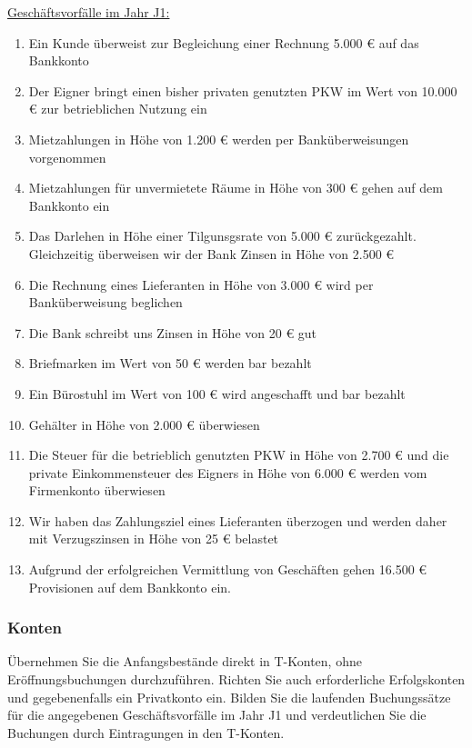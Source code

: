 \documentclass[paper=a4, fontsize=11pt]{scrartcl}
\numberwithin{equation}{section}
\numberwithin{figure}{section}
\numberwithin{table}{section}
\begin{document}
\underline{Geschäftsvorfälle im Jahr J1:} 

\begin{enumerate}
\item Ein Kunde überweist zur Begleichung einer Rechnung 5.000 € auf das Bankkonto
\item Der Eigner bringt einen bisher privaten genutzten PKW im Wert von 10.000 € zur betrieblichen Nutzung ein
\item Mietzahlungen in Höhe von 1.200 € werden per Banküberweisungen vorgenommen
\item Mietzahlungen für unvermietete Räume in Höhe von 300 € gehen auf dem Bankkonto ein
\item Das Darlehen in Höhe einer Tilgunsgsrate von 5.000 € zurückgezahlt. Gleichzeitig überweisen wir der Bank Zinsen in Höhe von 2.500 €
\item Die Rechnung eines Lieferanten in Höhe von 3.000 € wird per Banküberweisung beglichen
\item Die Bank schreibt uns Zinsen in Höhe von 20 € gut
\item Briefmarken im Wert von 50 € werden bar bezahlt
\item Ein Bürostuhl im Wert von 100 € wird angeschafft und bar bezahlt
\item Gehälter in Höhe von 2.000 € überwiesen
\item Die Steuer für die betrieblich genutzten PKW in Höhe von 2.700 € und die private Einkommensteuer des Eigners in Höhe von 6.000 € werden vom Firmenkonto überwiesen
\item Wir haben das Zahlungsziel eines Lieferanten überzogen und werden daher mit Verzugszinsen in Höhe von 25 € belastet
\item Aufgrund der erfolgreichen Vermittlung von Geschäften gehen 16.500 € Provisionen auf dem Bankkonto ein.
\end{enumerate}


\subsubsection{Konten}

Übernehmen Sie die Anfangsbestände direkt in T-Konten, ohne Eröffnungsbuchungen durchzuführen. Richten Sie auch erforderliche Erfolgskonten und gegebenenfalls ein Privatkonto ein. Bilden Sie die laufenden Buchungssätze für die angegebenen Geschäftsvorfälle im Jahr J1 und verdeutlichen Sie die Buchungen durch Eintragungen in den T-Konten. \\
\end{document}
